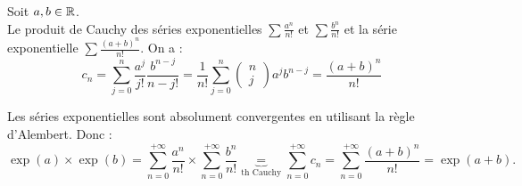 \documentclass{book}
\begin{document}
\begin{Exemple}
Soit $a,b\in\mathbb{R}$.\\
Le produit de Cauchy des séries  exponentielles $\sum \frac{a^n}{n!}$ et $\sum \frac{b^n}{n!}$  et la série  exponentielle $\sum \frac{(a+b)^n}{n!}$.
On a : $$c_n= \sum_{j=0}^n \frac{a^j}{j!} \frac{b^{n-j}}{n-j!}=\frac{1 }{n!}\sum_{j=0}^n \begin{pmatrix}
n\\j
\end{pmatrix} a^j b^{n-j} = \frac{(a+b)^n}{n!}$$ 

Les séries exponentielles sont absolument convergentes en utilisant la règle d'Alembert. Donc :
$$\exp(a)\times \exp(b)= \sum_{n=0}^{+\infty} \frac{a^n}{n!}\times \sum_{n=0}^{+\infty} \frac{b^n}{n!}\underbrace{=}_{\text{th Cauchy}}\sum_{n=0}^{+\infty} c_n= \sum_{n=0}^{+\infty} \frac{(a+b)^n}{n!} =\exp(a+b).$$   
\end{Exemple}
\end{document}
